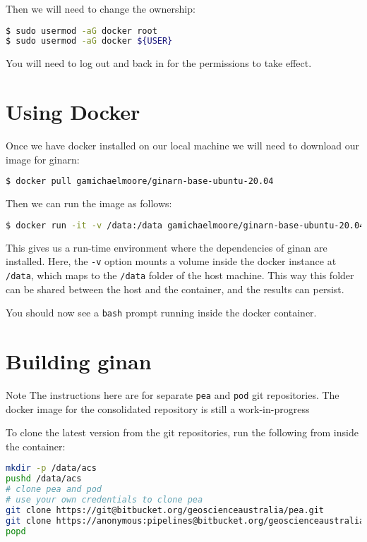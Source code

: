 Then we will need to change the ownership:
\begin{lstlisting}[language=bash]
$ sudo usermod -aG docker root
$ sudo usermod -aG docker ${USER}
\end{lstlisting}
You will need to log out and back in for the permissions to take effect.

\section{Using Docker}

Once we have docker installed on our local machine we will need to download our image for ginarn:
\begin{lstlisting}[language=bash]
$ docker pull gamichaelmoore/ginarn-base-ubuntu-20.04
\end{lstlisting}
Then we can run the image as follows:
\begin{lstlisting}[language=bash]
$ docker run -it -v /data:/data gamichaelmoore/ginarn-base-ubuntu-20.04 bash
\end{lstlisting}
This gives us a run-time environment where the dependencies of ginan are installed.
Here, the \texttt{-v} option mounts a volume inside the docker instance at \texttt{/data},
which maps to the \texttt{/data} folder of the host machine. This way this folder
can be shared between the host and the container, and the results can persist.

You should now see a \texttt{bash} prompt running inside the docker container.

\section{Building ginan}

\begin{subsection}{Note}
The instructions here are for separate \texttt{pea} and \texttt{pod} git repositories.
The docker image for the consolidated repository is still a work-in-progress
\end{subsection}

To clone the latest version from the git repositories, run the following from inside the container:
\begin{lstlisting}[language=bash]
mkdir -p /data/acs
pushd /data/acs
# clone pea and pod
# use your own credentials to clone pea
git clone https://git@bitbucket.org/geoscienceaustralia/pea.git
git clone https://anonymous:pipelines@bitbucket.org/geoscienceaustralia/pod.git
popd
\end{lstlisting}

